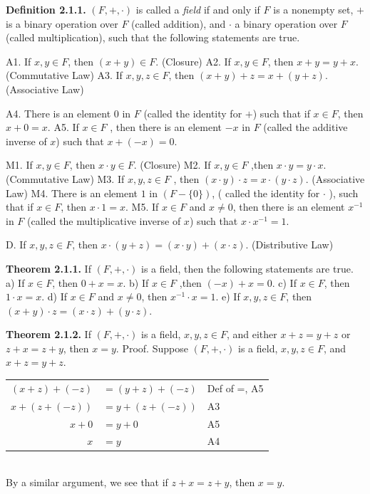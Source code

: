 \begin{large}
\textbf{Definition 2.1.1.} $(F, +,\cdot)$ is called a \textit{field} if and only if $F$ is a nonempty set, $+$ is a binary operation over $F$ (called addition), and $\cdot$ a binary operation over $F$ (called multiplication), such that the following statements are true. \nl

A1. If $x,y \in F$, then $(x+y) \in F$. (Closure)  \nl
A2. If $x,y \in F$, then $x + y = y + x$. (Commutative Law) \nl
A3. If $x,y,z \in F$, then $(x+y)+z=x+(y+z)$. (Associative Law) \nl
 \newpage

A4. There is an element $0$ in $F$ (called the identity for $+$) such that if $x \in F$, then $x + 0 = x.$ \nl
A5. If $x \in F$ , then there is an element $-x$ in $F$ (called the additive inverse
of $x$) such that $x+(-x)=0.$ \nl

M1. If $x,y \in F$, then $x\cdot y \in F$. (Closure) \nl
M2. If $x,y \in F$ ,then $x \cdot y = y \cdot x$. (Commutative Law) \nl
M3. If $x,y,z \in F$ , then $(x \cdot y)\cdot z = x \cdot(y\cdot z)$. (Associative Law)\nl
M4. There is an element $1$ in $(F-\{ 0\})$, ( called the identity for $\cdot$ ), such that if $x \in F$, then $x\cdot 1 =x $.\nl
M5.  If $x \in F$ and $x \neq 0$, then there is an element $x^{-1}$  in $F$ (called the multiplicative inverse of $x$) such that $x\cdot x^{-1} =1.$ \nl

D.	If $x,y,z \in F$, then $x\cdot(y + z) =(x\cdot y)+(x\cdot z)$. (Distributive Law) \nl

\textbf{Theorem 2.1.1.} If $(F,+ ,\cdot)$ is a field, then the following statements are true. \nl
a) If $x \in F$, then $0 + x = x.$\nl
b) If $x \in F$ ,then $(-x) + x = 0$. \nl
c) If $x \in F$, then $1\cdot x=x.$\nl
d) If $x \in F$ and $x \neq 0$, then $ x^{-1}\cdot x = 1.$ \nl
e) If $x,y,z \in F$, then $(x+y)\cdot z=(x\cdot z) + (y\cdot z).$\nl

\textbf{Theorem 2.1.2.} If $(F,+,\cdot)$ is a field, $x,y,z \in F$, and either $x + z = y + z$ or $z + x = z + y$, then $x = y.$ \nl
Proof. Suppose $(F,+,\cdot)$ is a field, $x,y,z \in F$, and $x + z = y + z$. \nl
\begin{tabular}{r l l}
$(x+z)+(-z)$&$=(y+z)+(-z)$ & Def of =, A5 \\
$x+(z+(-z))$&$=y+(z+(-z))$ & A3 \\
$x+0$&$= y+0$ &A5 \\
$x$& $= y$ & A4 \\
\end{tabular}\\
By a similar argument, we see that if $z + x = z + y$, then $x = y.$\nl


\end{large}

